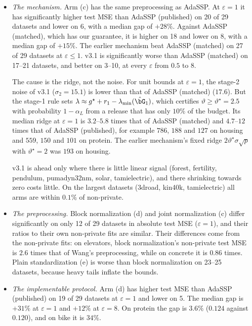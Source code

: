 \begin{itemize}
  \item \emph{The mechanism.} Arm (c) has the same preprocessing as AdaSSP. At $\varepsilon = 1$ it has significantly higher test MSE than AdaSSP (published) on 20 of 29 datasets and lower on 6, with a median gap of $+28\%$. Against AdaSSP (matched), which has our guarantee, it is higher on 18 and lower on 8, with a median gap of $+15\%$. The earlier mechanism beat AdaSSP (matched) on 27 of 29 datasets at $\varepsilon \le 1$. v3.1 is significantly worse than AdaSSP (matched) on 17--21 datasets, and better on 3--10, at every $\varepsilon$ from $0.5$ to $8$.

  The cause is the ridge, not the noise. For unit bounds at $\varepsilon = 1$, the stage-2 noise of v3.1 ($\sigma_2 = 15.1$) is lower than that of AdaSSP (matched) ($17.6$). But the stage-1 rule sets $\lambda \approx g^\star + r_1 - \lambda_{\min}(\hat\bG_1)$, which certifies $\vartheta \ge \vartheta^\star = 2.5$ with probability $1 - \alpha_L$ from a release that has only $10\%$ of the budget. Its median ridge at $\varepsilon = 1$ is $3.2$--$5.8$ times that of AdaSSP (matched) and $4.7$--$12$ times that of AdaSSP (published), for example $786$, $188$ and $127$ on housing and $559$, $150$ and $101$ on protein. The earlier mechanism's fixed ridge $2\vartheta^\star\sigma\sqrt p$ with $\vartheta^\star = 2$ was $193$ on housing.

  v3.1 is ahead only where there is little linear signal (forest, fertility, pendulum, pumadyn32nm, solar, tamielectric), and there shrinking towards zero costs little. On the largest datasets (3droad, kin40k, tamielectric) all arms are within $0.1\%$ of non-private.
  \item \emph{The preprocessing.} Block normalization (d) and joint normalization (c) differ significantly on only 12 of 29 datasets in absolute test MSE ($\varepsilon = 1$), and their ratios to their own non-private fits are similar. Their differences come from the non-private fits: on elevators, block normalization's non-private test MSE is $2.6$ times that of Wang's preprocessing, while on concrete it is $0.86$ times. Plain standardization (e) is worse than block normalization on 23--25 datasets, because heavy tails inflate the bounds.
  \item \emph{The implementable protocol.} Arm (d) has higher test MSE than AdaSSP (published) on 19 of 29 datasets at $\varepsilon = 1$ and lower on 5. The median gap is $+31\%$ at $\varepsilon = 1$ and $+12\%$ at $\varepsilon = 8$. On protein the gap is $3.6\%$ ($0.124$ against $0.120$), and on bike it is $34\%$.
\end{itemize}

